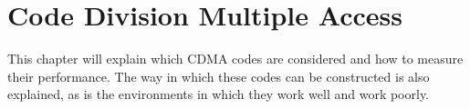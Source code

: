 
\chapter{Code Division Multiple Access}
\label{chp:cdma}


This chapter will explain which CDMA codes are considered and how to measure their performance.
The way in which these codes can be constructed is also explained, as is the environments in which they work well and work poorly. 









